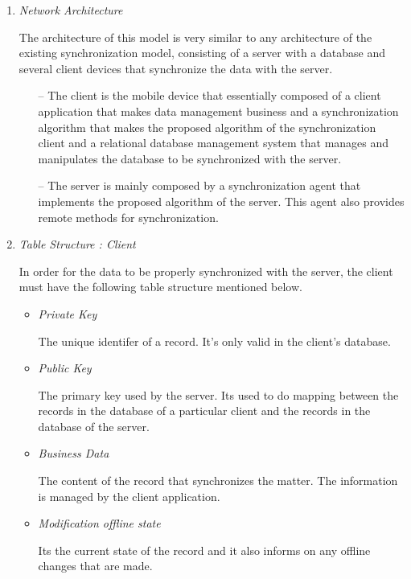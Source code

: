 \documentclass[conference]{IEEEtran}
\begin{document}
\begin{enumerate}[label=(\Alph*)]
\setlength\itemsep{1em}
\item  \textit{Network Architecture}

The architecture of this model is very similar to any architecture of the existing synchronization model, consisting of a server with a database and several client devices that synchronize the data with the server.
\begin{itemize}
 	\item[--] The client is the mobile device that essentially composed of a client application that makes data management business and a synchronization algorithm that makes the proposed algorithm of the synchronization client and a relational database management system that manages and manipulates the database to be synchronized with the server.

	\item[--] The server is mainly composed by a synchronization agent that implements the proposed algorithm of the  server. This agent also provides remote methods for synchronization.
\end{itemize}

\item  \textit{Table Structure : Client}

In order for the data to be properly synchronized with the server, the client must have the following table structure mentioned below.
\begin{itemize}
	\item \textit{ Private Key}

The unique identifer of a record. It's only valid in the client's database.

	\item  \textit{ Public Key}

The primary key used by the server. Its used to do mapping between the records in the database of a particular client and the records in the database of the server.

	\item  \textit{Business Data}

The content of the record that synchronizes the matter. The information is managed by the client application.

	\item \textit{Modification offline state}

Its the current state of the record and it also informs on any offline changes that are made.


\end{itemize}
\end{enumerate}
\end{document}
